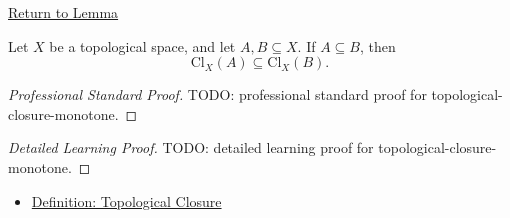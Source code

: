 \newpage
{}
\label{prf:topological-closure-monotone}

\begin{remark*}[Return]
\hyperref[lem:topological-closure-monotone]{Return to Lemma}
\end{remark*}

\begin{lemma*}
Let \(X\) be a topological space, and let \(A,B\subseteq X\).  If
\(A\subseteq B\), then
\[
\mathrm{Cl}_{X}(A)\subseteq\mathrm{Cl}_{X}(B).
\]
\end{lemma*}

\begin{proof}[Professional Standard Proof]
\LRAProofBodyStart
TODO: professional standard proof for topological-closure-monotone.
\end{proof}

\begin{proof}[Detailed Learning Proof]
\LRAProofBodyStart
TODO: detailed learning proof for topological-closure-monotone.
\end{proof}

\begin{remark*}
\end{remark*}

\begin{dependencies}
\begin{itemize}
  \item \hyperref[def:topological-closure]{Definition: Topological Closure}
\end{itemize}
\end{dependencies}

\clearpage
